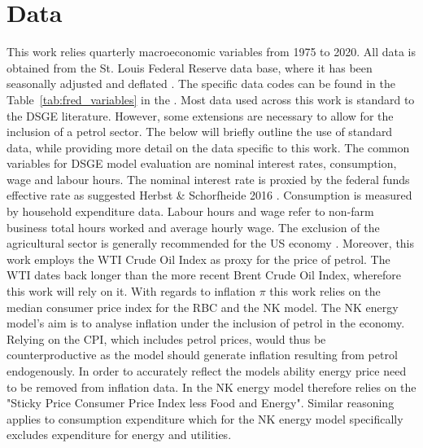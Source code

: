 \documentclass[12pt,a4paper,english]{article} %
\let\oldsection\section
\renewcommand\section{\clearpage\oldsection}
\begin{document}
	\section{Data}
	This work relies quarterly macroeconomic variables from 1975 to 2020. All data is obtained from the St. Louis Federal Reserve data base, where it has been seasonally adjusted and deflated \cite{noauthor_federal_nodate}. The specific data codes can be found in the  Table~\ref{tab:fred_variables} in the . Most data used across this work is standard to the DSGE literature. However, some extensions are necessary to allow for the inclusion of a petrol sector. The below will briefly outline the use of standard data, while providing more detail on the data specific to this work.
	The common variables for DSGE model evaluation are nominal interest rates, consumption, wage and labour hours. The nominal interest rate is proxied by the federal funds effective rate as suggested Herbst \& Schorfheide 2016 \cite{herbst_bayesian_2016}. Consumption is measured by household expenditure data. Labour hours and wage refer to non-farm business total hours worked and average hourly wage. The exclusion of the agricultural sector is generally recommended for the US economy \cite{guerron-quintana_bayesian_2013}. Moreover, this work employs the WTI Crude Oil Index as proxy for the price of petrol. The WTI dates back longer than the more recent Brent Crude Oil Index, wherefore this work will rely on it.
	With regards to inflation $\pi$ this work relies on the median consumer price index for the RBC and the NK model. The NK energy model's aim is to analyse inflation under the inclusion of petrol in the economy. Relying on the CPI, which includes petrol prices, would thus be counterproductive as the model should generate inflation resulting from petrol endogenously. In order to accurately reflect the models ability energy price need to be removed from inflation data. In the NK energy model therefore relies on the "Sticky Price Consumer Price Index less Food and Energy". Similar reasoning applies to consumption expenditure which for the NK energy model specifically excludes expenditure for energy and utilities.
	
\end{document}
